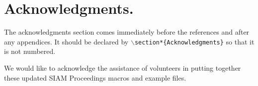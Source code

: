 \documentclass[twoside,leqno,twocolumn]{article}
\begin{document}
\section*{Acknowledgments.}
The acknowledgments section comes
immediately before the references and after any appendices. It should
be declared by $\backslash$\texttt{section*\{Acknowledgments\}} so that it is not numbered.

We would like to acknowledge the assistance of volunteers in putting
together these updated SIAM Proceedings macros and example files.



\end{document}
